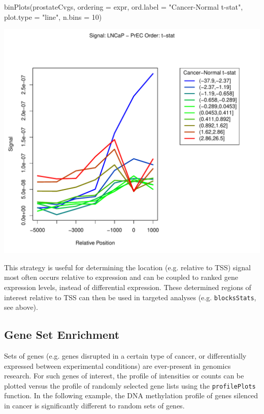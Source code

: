 \begin{Schunk}
\begin{Sinput}
 binPlots(prostateCvgs, ordering = expr, ord.label = "Cancer-Normal t-stat",
          plot.type = "line", n.bins = 10)
\end{Sinput}
\end{Schunk}
\includegraphics{visualisations-binPlotsLine}

This strategy is useful for determining the location (e.g. relative to TSS) signal most often occurs relative to expression and can be coupled to ranked gene expression levels, instead of differential expression.  These determined regions of interest relative to TSS can then be used in targeted analyses (e.g. \texttt{blocksStats}, see above).

\subsection{Gene Set Enrichment}

Sets of genes (e.g. genes disrupted in a certain type of cancer, or differentially expressed between experimental conditions) are ever-present in genomics research.  For such genes of interest, the profile of intensities or counts can be plotted versus the profile of randomly selected gene lists using the \texttt{profilePlots} function. In the following example, the DNA methylation profile of genes silenced in cancer is significantly different to random sets of genes.

